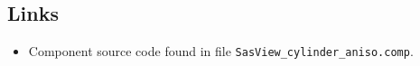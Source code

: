 \subsection*{Links}
\begin{itemize}
  \item Component source code found in file \texttt{SasView\_cylinder\_aniso.comp}.
\end{itemize}
